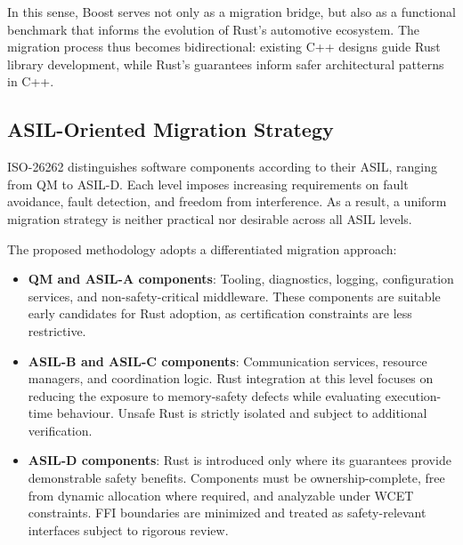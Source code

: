         In this sense, Boost serves not only as a migration bridge, but also as a
        functional benchmark that informs the evolution of Rust’s automotive ecosystem.
        The migration process thus becomes bidirectional: existing C++ designs guide
        Rust library development, while Rust’s guarantees inform safer architectural
        patterns in C++.

        \subsection{\gls{ASIL}-Oriented Migration Strategy}

        ISO-26262 distinguishes software components according to their
        \gls{ASIL}, ranging from \gls{QM} to \gls{ASIL}-D. Each level imposes increasing
        requirements on fault avoidance, fault detection, and freedom from interference.
        As a result, a uniform migration strategy is neither practical nor desirable
        across all \gls{ASIL} levels.

        The proposed methodology adopts a differentiated migration approach:

        \begin{itemize}
        \item \textbf{QM and \gls{ASIL}-A components}: Tooling, diagnostics, logging,
        configuration services, and non-safety-critical middleware. These components
        are suitable early candidates for Rust adoption, as certification
        constraints are less restrictive.

        \item \textbf{\gls{ASIL}-B and \gls{ASIL}-C components}: Communication services, resource
        managers, and coordination logic. Rust integration at this level focuses on
        reducing the exposure to memory-safety defects while evaluating execution-time behaviour.
        Unsafe Rust is strictly isolated and subject to additional verification.

        \item \textbf{\gls{ASIL}-D components}: Rust is introduced only where its guarantees
        provide demonstrable safety benefits. Components must be ownership-complete,
        free from dynamic allocation where required, and analyzable under
        \gls{WCET} constraints. \gls{FFI} boundaries are minimized and treated as
        safety-relevant interfaces subject to rigorous review.
        \end{itemize}

